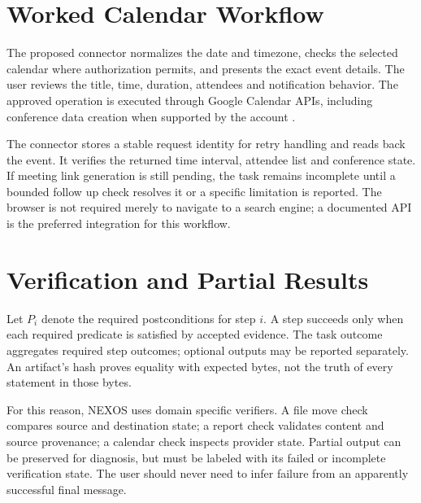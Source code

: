 \section{Worked Calendar Workflow}
The proposed connector normalizes the date and timezone, checks the selected calendar where authorization permits, and presents the exact event details. The user reviews the title, time, duration, attendees and notification behavior. The approved operation is executed through Google Calendar APIs, including conference data creation when supported by the account \cite{calendar}.

The connector stores a stable request identity for retry handling and reads back the event. It verifies the returned time interval, attendee list and conference state. If meeting link generation is still pending, the task remains incomplete until a bounded follow up check resolves it or a specific limitation is reported. The browser is not required merely to navigate to a search engine; a documented API is the preferred integration for this workflow.

\section{Verification and Partial Results}
Let $P_i$ denote the required postconditions for step $i$. A step succeeds only when each required predicate is satisfied by accepted evidence. The task outcome aggregates required step outcomes; optional outputs may be reported separately. An artifact's hash proves equality with expected bytes, not the truth of every statement in those bytes.

For this reason, NEXOS uses domain specific verifiers. A file move check compares source and destination state; a report check validates content and source provenance; a calendar check inspects provider state. Partial output can be preserved for diagnosis, but must be labeled with its failed or incomplete verification state. The user should never need to infer failure from an apparently successful final message.
